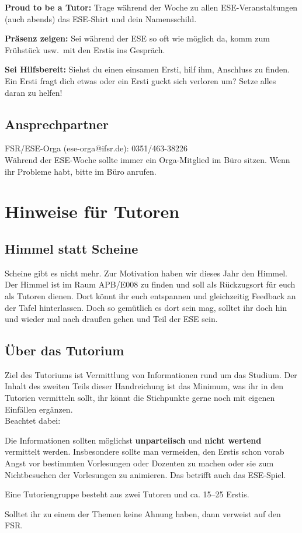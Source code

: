 \documentclass[a4paper,12pt]{report}
\begin{document}
\begin{itemize*}
    \item \textbf{Proud to be a Tutor:} Trage während der Woche zu allen ESE-Veranstaltungen (auch abends) das ESE-Shirt und dein Namensschild.
    \item \textbf{Präsenz zeigen:} Sei während der ESE so oft wie möglich da, komm zum Frühstück usw.\ mit den Erstis ins Gespräch.
    \item \textbf{Sei Hilfsbereit:} Siehst du einen einsamen Ersti, hilf ihm, Anschluss zu finden. Ein Ersti fragt dich etwas oder ein Ersti guckt sich verloren um? Setze alles daran zu helfen!
\end{itemize*}

\section*{Ansprechpartner}
FSR/ESE-Orga (ese-orga@ifsr.de): 0351/463-38226 \\

Während der ESE-Woche sollte immer ein Orga-Mitglied im Büro sitzen. Wenn ihr Probleme habt, bitte im Büro anrufen.

\tableofcontents
\chapter{Hinweise für Tutoren}
\section{Himmel statt Scheine}
Scheine gibt es nicht mehr. Zur Motivation haben wir dieses Jahr den Himmel. Der Himmel ist im Raum APB/E008 zu finden und soll als Rückzugsort für euch als Tutoren dienen. Dort könnt ihr euch entspannen und gleichzeitig Feedback an der Tafel hinterlassen. Doch so gemütlich es dort sein mag, solltet ihr doch hin und wieder mal nach draußen gehen und Teil der ESE sein.

\section{Über das Tutorium}
Ziel des Tutoriums ist Vermittlung von Informationen rund um das Studium. Der Inhalt des zweiten Teils dieser Handreichung ist das Minimum, was ihr in den Tutorien vermitteln sollt, ihr könnt die Stichpunkte gerne noch mit eigenen Einfällen ergänzen.\\
Beachtet dabei:
\begin{itemize*}
\item Die Informationen sollten möglichst \textbf{unparteiisch} und \textbf{nicht wertend} vermittelt werden.
Insbesondere sollte man vermeiden, den Erstis schon vorab Angst vor bestimmten Vorlesungen oder Dozenten zu machen oder sie zum Nichtbesuchen der Vorlesungen zu animieren. Das betrifft auch das ESE-Spiel.
\item Eine Tutoriengruppe besteht aus zwei Tutoren und ca. 15--25 Erstis.
\item Solltet ihr zu einem der Themen keine Ahnung haben, dann verweist auf den FSR\@.
\end{itemize*}
\end{document}

